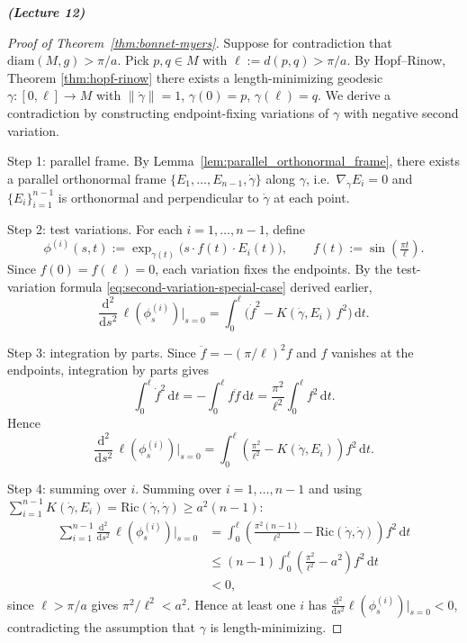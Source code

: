 


\vspace{0.4cm}\emph{\textbf{(Lecture 12)}}\\


\begin{proof}[Proof of Theorem~\ref{thm:bonnet-myers}]
Suppose for contradiction that $\mathrm{diam}(M, g) > \pi/a$. Pick $p, q \in M$ with $\ell := d(p, q) > \pi/a$. By Hopf--Rinow, Theorem \ref{thm:hopf-rinow} there exists a length-minimizing geodesic $\gamma \colon [0, \ell] \to M$ with $\|\dot\gamma\| = 1$, $\gamma(0) = p$, $\gamma(\ell) = q$. We derive a contradiction by constructing endpoint-fixing variations of $\gamma$ with negative second variation.

{Step 1: parallel frame.} By Lemma~\ref{lem:parallel_orthonormal_frame}, there exists a parallel orthonormal frame $\{E_1, \ldots, E_{n-1}, \dot\gamma\}$ along $\gamma$, i.e.\ $\nabla_{\dot\gamma} E_i = 0$ and $\{E_i\}_{i=1}^{n-1}$ is orthonormal and perpendicular to $\dot\gamma$ at each point.

{Step 2: test variations.} For each $i = 1, \ldots, n - 1$, define
\[
\phi^{(i)}(s, t) := \exp_{\gamma(t)}\!\big(s \cdot f(t) \cdot E_i(t)\big), \qquad f(t) := \sin\!\left(\tfrac{\pi t}{\ell}\right).
\]
Since $f(0) = f(\ell) = 0$, each variation fixes the endpoints. By the test-variation formula \eqref{eq:second-variation-special-case} derived earlier,
\[
\frac{\mathrm{d}^2}{\mathrm{d}s^2}\,\ell(\phi_s^{(i)})\bigg|_{s = 0} = \int_0^\ell \!\big(\dot f^2 - K(\dot\gamma, E_i)\, f^2\big)\,\mathrm{d}t.
\]

{Step 3: integration by parts.} Since $\ddot f = -(\pi/\ell)^2 f$ and $f$ vanishes at the endpoints, integration by parts gives
\[
\int_0^\ell \dot f^2\,\mathrm{d}t = -\int_0^\ell f \ddot f\, \mathrm{d}t = \frac{\pi^2}{\ell^2} \int_0^\ell f^2\, \mathrm{d}t.
\]
Hence
\[
\frac{\mathrm{d}^2}{\mathrm{d}s^2}\,\ell(\phi_s^{(i)})\bigg|_{s = 0} = \int_0^\ell \!\left(\tfrac{\pi^2}{\ell^2} - K(\dot\gamma, E_i)\right) f^2\, \mathrm{d}t.
\]

{Step 4: summing over $i$.} Summing over $i = 1, \ldots, n - 1$ and using $\sum_{i=1}^{n-1} K(\dot\gamma, E_i) = \mathrm{Ric}(\dot\gamma, \dot\gamma) \geqslant a^2(n - 1)$:
\begin{align*}
    \sum_{i=1}^{n-1} \frac{\mathrm{d}^2}{\mathrm{d}s^2}\,\ell(\phi_s^{(i)})\bigg|_{s = 0} 
    &= \int_0^\ell \!\left(\tfrac{\pi^2(n-1)}{\ell^2} - \mathrm{Ric}(\dot\gamma, \dot\gamma)\right) f^2\, \mathrm{d}t \\
    &\leqslant (n - 1) \int_0^\ell \!\left(\tfrac{\pi^2}{\ell^2} - a^2\right) f^2\, \mathrm{d}t \\
    &< 0,
\end{align*}
since $\ell > \pi/a$ gives $\pi^2/\ell^2 < a^2$. Hence at least one $i$ has $\frac{\mathrm{d}^2}{\mathrm{d}s^2}\ell(\phi_s^{(i)})|_{s=0} < 0$, contradicting the assumption that $\gamma$ is length-minimizing. \qedhere
\end{proof}

